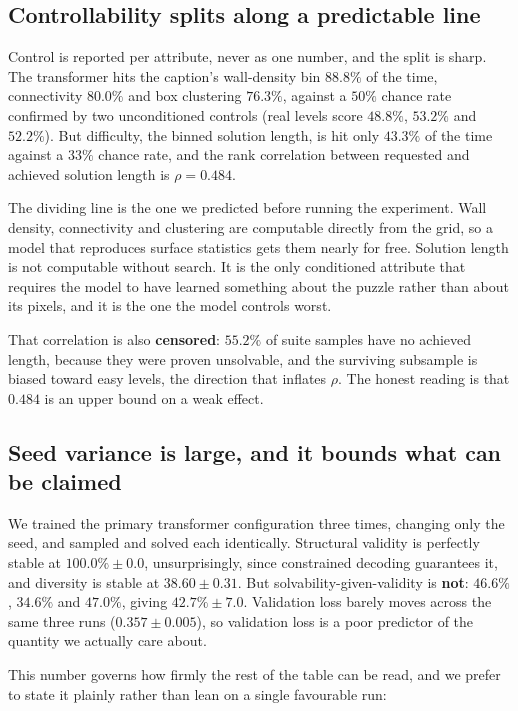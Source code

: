 \documentclass[conference]{IEEEtran}
\begin{document}
\subsection{Controllability splits along a predictable line}
Control is reported per attribute, never as one number, and the split is sharp.
The transformer hits the caption's wall-density bin $88.8\%$ of the time,
connectivity $80.0\%$ and box clustering $76.3\%$, against a $50\%$ chance rate
confirmed by two unconditioned controls (real levels score $48.8\%$, $53.2\%$
and $52.2\%$). But difficulty, the binned solution length, is hit only
$43.3\%$ of the time against a $33\%$ chance rate, and the rank correlation
between requested and achieved solution length is $\rho = 0.484$.

The dividing line is the one we predicted before running the experiment. Wall
density, connectivity and clustering are computable directly from the grid, so a
model that reproduces surface statistics gets them nearly for free. Solution
length is not computable without search. It is the only conditioned attribute
that requires the model to have learned something about the puzzle rather than
about its pixels, and it is the one the model controls worst.

That correlation is also \textbf{censored}: $55.2\%$ of suite samples have no
achieved length, because they were proven unsolvable, and the surviving
subsample is biased toward easy levels, the direction that inflates $\rho$.
The honest reading is that $0.484$ is an upper bound on a weak effect.

\subsection{Seed variance is large, and it bounds what can be claimed}
\label{sec:seeds}
We trained the primary transformer configuration three times, changing only the
seed, and sampled and solved each identically. Structural validity is perfectly
stable at $100.0\% \pm 0.0$, unsurprisingly, since constrained decoding
guarantees it, and diversity is stable at $38.60 \pm 0.31$. But
solvability-given-validity is \textbf{not}: $46.6\%$, $34.6\%$ and $47.0\%$,
giving $42.7\% \pm 7.0$. Validation loss barely moves across the same three runs
($0.357 \pm 0.005$), so validation loss is a poor predictor of the quantity we
actually care about.

This number governs how firmly the rest of the table can be read, and we prefer
to state it plainly rather than lean on a single favourable run:
\end{document}
